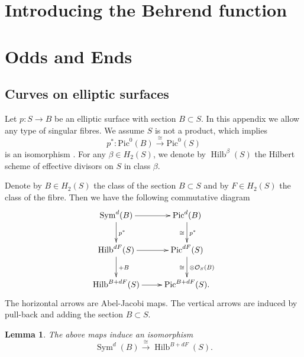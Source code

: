 \documentclass{amsart}
\newtheorem{lemma}[theorem]{Lemma}
\theoremstyle{definition}
\newtheorem{remark}[theorem]{Remark}
\renewcommand{\O}{\mathcal{O}}
\newcommand{\Pic}{\mathrm{Pic}}
\newcommand{\Sym}{\operatorname{Sym}}
\newcommand{\Hilb}{\operatorname{Hilb}}
\begin{document}
\section{Introducing the Behrend function} \label{Behrend}


\appendix
\section{Odds and Ends}\label{appendix: odds and ends}

\subsection{Curves on elliptic surfaces}\label{appHilb}

Let $p : S \rightarrow B$ be an elliptic surface with section $B \subset S$. In this appendix we allow any type of singular fibres. We assume $S$ is not a product, which implies
$$
p^* : \Pic^0(B) \stackrel{\cong}{\longrightarrow} \Pic^0(S)
$$
is an isomorphism \cite[VII.1.1]{Mir}. For any $\beta \in H_2(S)$, we denote by $\Hilb^\beta(S)$ the Hilbert scheme of effective divisors on $S$ in class $\beta$. 

Denote by $B \in H_2(S)$ the class of the section $B \subset S$ and by $F \in H_2(S)$ the class of the fibre. Then we have the following commutative diagram 
\begin{displaymath}
\xymatrix
{
\Sym^d(B) \ar[d]^{p^*} \ar[r] & \Pic^d(B) \ar[d]^{p^*}_{\cong} \\
\Hilb^{dF}(S) \ar[d]^{+B} \ar[r] & \Pic^{dF}(S) \ar[d]^{\otimes \O_S(B)}_{\cong} \\
\Hilb^{B+dF}(S) \ar[r] & \Pic^{B+dF}(S). 
}
\end{displaymath}
The horizontal arrows are Abel-Jacobi maps. The vertical arrows are induced by pull-back and adding the section $B \subset S$. 
\begin{lemma} \label{Hilbcvs}
The above maps induce an isomorphism
$$
\Sym^d(B) \stackrel{\cong}{\longrightarrow} \Hilb^{B+dF}(S).
$$
\end{lemma}

\end{document}
